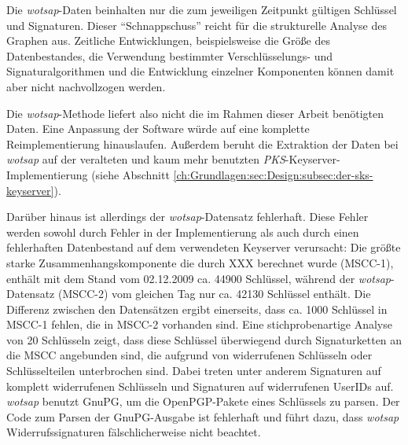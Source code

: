 Die \emph{wotsap}-Daten beinhalten nur die zum jeweiligen Zeitpunkt
gültigen Schlüssel und Signaturen. Dieser "`Schnappschuss"' reicht für
die strukturelle Analyse des Graphen aus. Zeitliche Entwicklungen,
beispielsweise die Größe des Datenbestandes, die Verwendung
bestimmter Verschlüsselungs- und Signaturalgorithmen und die Entwicklung
einzelner Komponenten können damit aber nicht nachvollzogen werden.

Die \emph{wotsap}-Methode liefert also nicht die im Rahmen dieser
Arbeit benötigten Daten. Eine Anpassung der Software würde auf eine
komplette Reimplementierung hinauslaufen. Außerdem beruht die
Extraktion der Daten bei \emph{wotsap} auf der veralteten und kaum
mehr benutzten \emph{PKS}-Keyserver-Implementierung (siehe Abschnitt
\ref{ch:Grundlagen:sec:Design:subsec:der-sks-keyserver}).

Darüber hinaus ist allerdings der \emph{wotsap}-Datensatz
fehlerhaft. Diese Fehler werden sowohl durch Fehler in der
Implementierung als auch durch einen fehlerhaften Datenbestand auf dem
verwendeten Keyserver verursacht: Die größte starke
Zusammenhangskomponente die durch XXX berechnet %
wurde (MSCC-1), enthält mit dem Stand vom 02.12.2009 ca. 44900
Schlüssel, während der \emph{wotsap}-Datensatz (MSCC-2) vom gleichen
Tag nur ca. 42130 Schlüssel enthält. Die Differenz zwischen den
Datensätzen ergibt einerseits, dass ca. 1000 Schlüssel in MSCC-1
fehlen, die in MSCC-2 vorhanden sind. Eine stichprobenartige Analyse
von 20 Schlüsseln zeigt, dass diese Schlüssel überwiegend durch
Signaturketten an die MSCC angebunden sind, die aufgrund von
widerrufenen Schlüsseln oder Schlüsselteilen unterbrochen sind. Dabei
treten unter anderem Signaturen auf komplett widerrufenen Schlüsseln und
Signaturen auf widerrufenen UserIDs auf. \emph{wotsap} benutzt GnuPG,
um die OpenPGP-Pakete eines Schlüssels zu parsen. Der Code zum Parsen
der GnuPG-Ausgabe ist fehlerhaft und führt dazu, dass \emph{wotsap}
Widerrufssignaturen fälschlicherweise nicht beachtet.

